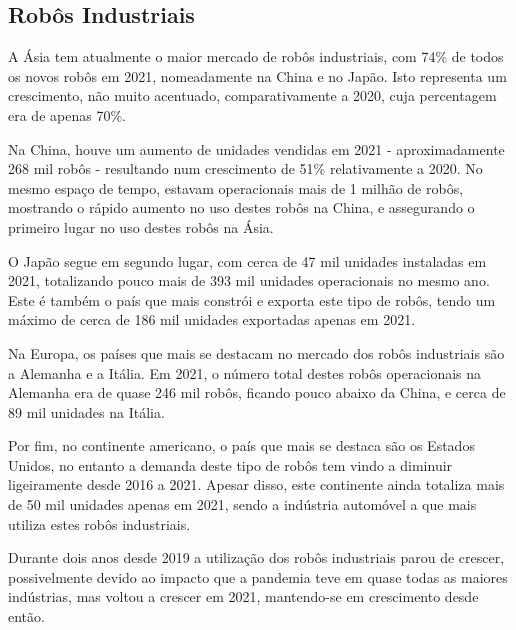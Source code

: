 \documentclass[10pt]{article}
\begin{document}
\subsection{Robôs Industriais}
\hspace{\parindent}A Ásia tem atualmente o maior mercado de robôs industriais\cite{internacional2}, com 74\% de todos os novos robôs em 2021, nomeadamente na China e no Japão. Isto representa um crescimento, não muito acentuado, comparativamente a 2020, cuja percentagem era de apenas 70\%.

Na China, houve um aumento de unidades vendidas em 2021 - aproximadamente 268 mil robôs - resultando num crescimento de 51\% relativamente a 2020. No mesmo espaço de tempo, estavam operacionais mais de 1 milhão de robôs, mostrando o rápido aumento no uso destes robôs na China, e assegurando o primeiro lugar no uso destes robôs na Ásia.

O Japão segue em segundo lugar, com cerca de 47 mil unidades instaladas em 2021, totalizando pouco mais de 393 mil unidades operacionais no mesmo ano. Este é também o país que mais constrói e exporta este tipo de robôs, tendo um máximo de cerca de 186 mil unidades exportadas apenas em 2021.

 Na Europa, os países que mais se destacam no mercado dos robôs industriais são a Alemanha e a Itália. Em 2021, o número total destes robôs operacionais na Alemanha era de quase 246 mil robôs, ficando pouco abaixo da China, e cerca de 89 mil unidades na Itália.
 
 Por fim, no continente americano, o país que mais se destaca são os Estados Unidos, no entanto a demanda deste tipo de robôs tem vindo a diminuir ligeiramente desde 2016 a 2021. Apesar disso, este continente ainda totaliza mais de 50 mil unidades apenas em 2021, sendo a indústria automóvel a que mais utiliza estes robôs industriais.

Durante dois anos desde 2019 a utilização dos robôs industriais parou de crescer, possivelmente devido ao impacto que a pandemia teve em quase todas as maiores indústrias, mas voltou a crescer em 2021, mantendo-se em crescimento desde então.
\end{document}
